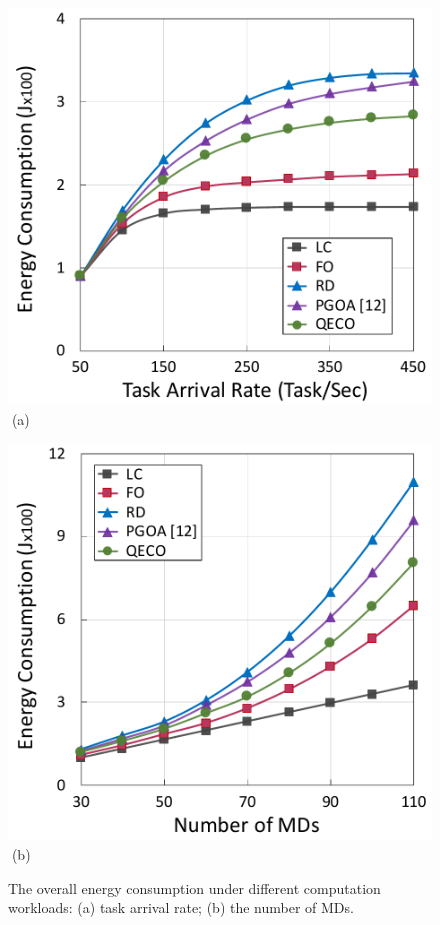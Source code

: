 \documentclass[12pt,draftclsnofoot,onecolumn]{IEEEtran}
\begin{document}
\begin{figure}[tbp]
	\centering
	\captionsetup{name=Fig.}
	\begin{minipage}[b]{0.340\linewidth}
		\centering
		\includegraphics[width=\textwidth]{Fig/energy_1} 		
		\textcolor{white}{i}\hspace{0.6cm}(a)
	\end{minipage}
	\begin{minipage}[b]{0.340\linewidth}
		\centering
		\includegraphics[width=\textwidth]{Fig/energy_2}
		\textcolor{white}{i}\hspace{0.6cm}(b)
	\end{minipage}
	\caption{The overall energy consumption under different computation workloads: (a) task arrival rate; (b) the number of MDs.}
	\label{chart2}
\end{figure}
\end{document}
